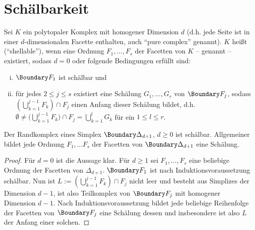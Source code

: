 \chapter{Schälbarkeit}



\begin{df}
    Sei $K$ ein polytopaler Komplex mit homogener Dimension $d$ (d.h. jede Seite ist in einer $d$-dimensionalen Facette enthalten, auch “pure complex” genannt).
    $K$ heißt  (“shellable”), wenn eine Ordnung $F_1, \dotsc, F_s$ der Facetten von $K$ – genannt  – existiert, sodass $d = 0$ oder folgende Bedingungen erfüllt sind:
    \begin{enumerate}[i)]
        \item
            $\Boundary F_1$ ist schälbar und
        \item
            für jedes $2 \le j \le s$ existiert eine Schälung $G_1, \dotsc, G_r$ von $\Boundary F_j$, sodass $(\bigcup_{k=1}^{j-1} F_k) \cap F_j$ einen Anfang dieser Schälung bildet, d.h.
            \begin{math}
                \emptyset \neq \Big( \bigcup_{k=1}^{j-1} F_k \Big) \cap F_j = \bigcup_{k=1}^{l} G_k
            \end{math}
            für ein $1 \le l \le r$.
    \end{enumerate}
\end{df}

\begin{lem}
    Der Randkomplex eines Simplex $\Boundary \Delta_{d+1}$, $d \ge 0$ ist schälbar.
    Allgemeiner bildet jede Ordnung $F_1, \dotsc F_s$ der Facetten von $\Boundary \Delta_{d+1}$ eine Schälung.
    \begin{proof}
        Für $d = 0$ ist die Aussage klar.
        Für $d \ge 1$ sei $F_1, \dotsc, F_s$ eine beliebige Ordnung der Facetten von $\Delta_{d+1}$.
        $\Boundary F_1$ ist nach Induktionsvoraussetzung schälbar.
        Nun ist $L := (\bigcup_{k=1}^{j-1} F_k) \cap F_j$ nicht leer und besteht aus Simplizes der Dimension $d - 1$, ist also Teilkomplex von $\Boundary F_j$ mit homogener Dimension $d - 1$.
        Nach Induktionsvoraussetzung bildet jede beliebige Reihenfolge der Facetten von $\Boundary F_j$ eine Schälung dessen und insbesondere ist also $L$ der Anfang einer solchen.
    \end{proof}
\end{lem}

